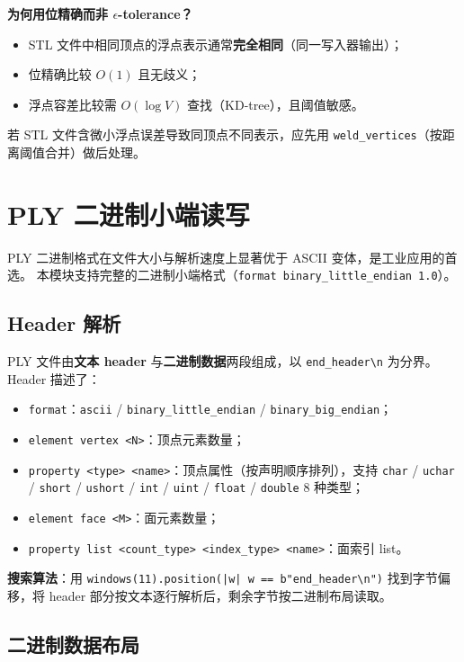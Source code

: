 \documentclass[11pt,a4paper]{article}
\begin{document}
\textbf{为何用位精确而非 $\epsilon$-tolerance？}
\begin{itemize}
  \item STL 文件中相同顶点的浮点表示通常\textbf{完全相同}（同一写入器输出）；
  \item 位精确比较 $O(1)$ 且无歧义；
  \item 浮点容差比较需 $O(\log V)$ 查找（KD-tree），且阈值敏感。
\end{itemize}

若 STL 文件含微小浮点误差导致同顶点不同表示，应先用
\texttt{weld\_vertices}（按距离阈值合并）做后处理。

\section{PLY 二进制小端读写}

PLY 二进制格式在文件大小与解析速度上显著优于 ASCII 变体，是工业应用的首选。
本模块支持完整的二进制小端格式（\texttt{format binary\_little\_endian 1.0}）。

\subsection{Header 解析}

PLY 文件由\textbf{文本 header} 与\textbf{二进制数据}两段组成，以 \texttt{end\_header\textbackslash n}
为分界。Header 描述了：
\begin{itemize}
  \item \texttt{format}：\texttt{ascii} / \texttt{binary\_little\_endian} / \texttt{binary\_big\_endian}；
  \item \texttt{element vertex <N>}：顶点元素数量；
  \item \texttt{property <type> <name>}：顶点属性（按声明顺序排列），支持
        \texttt{char} / \texttt{uchar} / \texttt{short} / \texttt{ushort} /
        \texttt{int} / \texttt{uint} / \texttt{float} / \texttt{double} 8 种类型；
  \item \texttt{element face <M>}：面元素数量；
  \item \texttt{property list <count\_type> <index\_type> <name>}：面索引 list。
\end{itemize}

\textbf{搜索算法}：用 \texttt{windows(11).position(|w| w == b"end\_header\textbackslash n")}
找到字节偏移，将 header 部分按文本逐行解析后，剩余字节按二进制布局读取。

\subsection{二进制数据布局}
\end{document}
